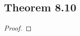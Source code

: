 \documentclass[../../main.tex]{subfiles}
\begin{document}
\subsection{Theorem 8.10}
\begin{wts}

\end{wts}
\begin{proof}

\end{proof}
\end{document}
